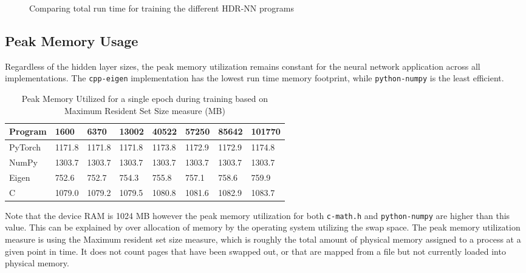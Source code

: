 \begin{figure}[!ht]
	\centering
	
	\caption[Execution Time vs Model Parameters]{Comparing total run time for training the different HDR-NN programs}
	\label{hdrnn-exectime}
\end{figure}

\subsection{Peak Memory Usage}

Regardless of the hidden layer sizes, the peak memory utilization remains constant for the neural network application across all implementations. The \texttt{cpp-eigen} implementation has the lowest run time memory footprint, while \texttt{python-numpy} is the least efficient.

\begin{table}[h]
	\centering
	\begin{tabular}{ |p{4em}|p{3em}|p{3em}|p{3em}|p{3em}|p{3em}|p{3em}|p{3em}| }
		\hline
		\textbf{Program} & \textbf{1600} & \textbf{6370} & \textbf{13002} & \textbf{40522} & \textbf{57250} & \textbf{85642} & \textbf{101770} \\
		\hline
		PyTorch & 1171.8 & 1171.8 & 1171.8 & 1173.8 & 1172.9 & 1172.9 & 1174.8 \\
		\hline
		NumPy & 1303.7 & 1303.7 & 1303.7 & 1303.7 & 1303.7 & 1303.7 & 1303.7 \\
		\hline
		Eigen & 752.6 & 752.7 & 754.3 & 755.8 & 757.1 & 758.6 & 759.9 \\
		\hline
		C & 1079.0 & 1079.2 & 1079.5 & 1080.8 & 1081.6 & 1082.9 & 1083.7\\
		\hline
	\end{tabular}
	\caption[Peak Memory Utilization]{Peak Memory Utilized for a single epoch during training based on Maximum Resident Set Size measure (MB)}
\end{table}

Note that the device RAM is 1024 MB however the peak memory utilization for both \texttt{c-math.h} and \texttt{python-numpy} are higher than this value. This can be explained by over allocation of memory by the operating system utilizing the swap space. The peak memory utilization measure is using the Maximum resident set size measure, which is roughly the total amount of physical memory assigned to a process at a given point in time. It does not count pages that have been swapped out, or that are mapped from a file but not currently loaded into physical memory.

